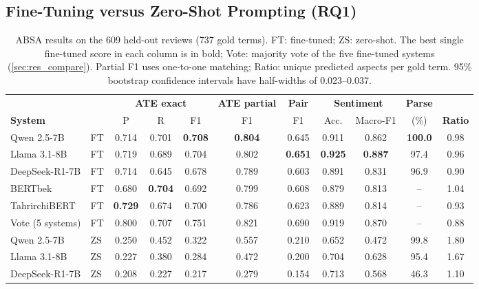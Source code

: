 \documentclass[runningheads]{llncs}
\begin{document}
\subsection{Fine-Tuning versus Zero-Shot Prompting (RQ1)}
\label{sec:res_zs}

\begin{table}[t]
\centering
\caption{ABSA results on the 609 held-out reviews (737 gold terms). FT: fine-tuned; ZS: zero-shot. The best single fine-tuned score in each column is in bold; Vote: majority vote of the five fine-tuned systems (\cref{sec:res_compare}). Partial F1 uses one-to-one matching; Ratio: unique predicted aspects per gold term. 95\% bootstrap confidence intervals have half-widths of 0.023--0.037.}
\label{tab:main}
\setlength{\tabcolsep}{2.4pt}
\footnotesize
\begin{tabular}{@{}llccccccccc@{}}
\toprule
& & \multicolumn{3}{c}{\textbf{ATE exact}} & \textbf{ATE partial} & \textbf{Pair} & \multicolumn{2}{c}{\textbf{Sentiment}} & \textbf{Parse} & \\
\cmidrule(lr){3-5}\cmidrule(lr){8-9}
\textbf{System} & & P & R & F1 & F1 & F1 & Acc. & Macro-F1 & (\%) & \textbf{Ratio} \\
\midrule
Qwen 2.5-7B    & FT & 0.714 & 0.701 & \textbf{0.708} & \textbf{0.804} & 0.645 & 0.911 & 0.862 & \textbf{100.0} & 0.98 \\
Llama 3.1-8B   & FT & 0.719 & 0.689 & 0.704 & 0.802 & \textbf{0.651} & \textbf{0.925} & \textbf{0.887} & 97.4 & 0.96 \\
DeepSeek-R1-7B & FT & 0.714 & 0.645 & 0.678 & 0.789 & 0.603 & 0.891 & 0.831 & 96.9 & 0.90 \\
BERTbek        & FT & 0.680 & \textbf{0.704} & 0.692 & 0.799 & 0.608 & 0.879 & 0.813 & -- & 1.04 \\
TahrirchiBERT  & FT & \textbf{0.729} & 0.674 & 0.700 & 0.786 & 0.623 & 0.889 & 0.814 & -- & 0.93 \\
\midrule
Vote (5 systems) & FT & 0.800 & 0.707 & 0.751 & 0.821 & 0.690 & 0.919 & 0.870 & -- & 0.88 \\
\midrule
Qwen 2.5-7B    & ZS & 0.250 & 0.452 & 0.322 & 0.557 & 0.210 & 0.652 & 0.472 & 99.8 & 1.80 \\
Llama 3.1-8B   & ZS & 0.227 & 0.380 & 0.284 & 0.472 & 0.200 & 0.704 & 0.628 & 95.4 & 1.67 \\
DeepSeek-R1-7B & ZS & 0.208 & 0.227 & 0.217 & 0.279 & 0.154 & 0.713 & 0.568 & 46.3 & 1.10 \\
\bottomrule
\end{tabular}
\end{table}
\end{document}

